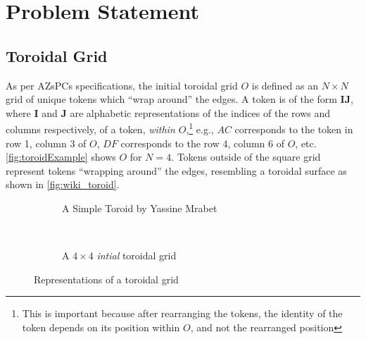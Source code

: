 \section{Problem Statement}%
\label{sec:problem_statement}

\subsection{Toroidal Grid}%
\label{sub:toroidal_grid}

As per AZsPCs\cite{zimmermann} specifications, the initial toroidal grid $O$ is defined as an $N\times N$ grid of unique tokens which ``wrap around'' the edges. A token is of the form $\bm{IJ}$, where $\bm{I}$ and $\bm{J}$ are alphabetic representations of the indices of the rows and columns respectively, of a token, \emph{within $O$},\footnote{This is important because after rearranging the tokens, the identity of the token depends on its position within $O$, and not the rearranged position} e.g., $AC$ corresponds to the token in row 1, column 3 of $O$, $DF$ corresponds to the row 4, column 6 of $O$, etc. \autoref{fig:toroidExample} shows $O$ for $N=4$. Tokens outside of the square grid represent tokens ``wrapping around'' the edges, resembling a toroidal surface as shown in \autoref{fig:wiki_toroid}.
\begin{figure}[htpb]
    \begin{subfigure}[t]{0.5\textwidth}
    \begin{center}
    \caption{A Simple Toroid by Yassine Mrabet\cite{wiki_toroid}}
    \label{fig:wiki_toroid}
    \end{center}
    \end{subfigure}
    ~
    \begin{subfigure}[t]{0.5\textwidth}
    \begin{center}
    \caption{A $4\times 4$ \emph{intial} toroidal grid}%
    \label{fig:toroidExample}
    \end{center}
    \end{subfigure}
    \caption{Representations of a toroidal grid}
\end{figure}

